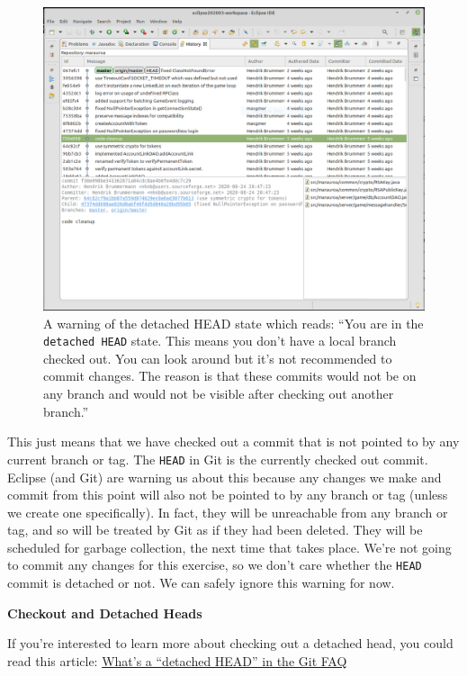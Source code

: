 \documentclass[
]{book}
\begin{document}
\begin{figure}

{\centering \includegraphics[width=1\linewidth]{images/1.4historyTab} 

}

\caption{A warning of the detached HEAD state which reads: ``You are in the \texttt{detached\ HEAD} state. This means you don't have a local branch checked out. You can look around but it's not recommended to commit changes. The reason is that these commits would not be on any branch and would not be visible after checking out another branch.''}\label{fig:detachedHEAD-fig}
\end{figure}



This just means that we have checked out a commit that is not pointed to by any current branch or tag. The \texttt{HEAD} in Git is the currently checked out commit. Eclipse (and Git) are warning us about this because any changes we make and commit from this point will also not be pointed to by any branch or tag (unless we create one specifically). In fact, they will be unreachable from any branch or tag, and so will be treated by Git as if they had been deleted. They will be scheduled for garbage collection, the next time that takes place. We're not going to commit any changes for this exercise, so we don't care whether the \texttt{HEAD} commit is detached or not. We can safely ignore this warning for now.

\textbf{Checkout and Detached Heads}

If you're interested to learn more about checking out a detached head, you could read this article: \href{https://www.git-tower.com/learn/git/faq/detached-head-when-checkout-commit}{What's a ``detached HEAD'' in the Git FAQ}
\end{document}

